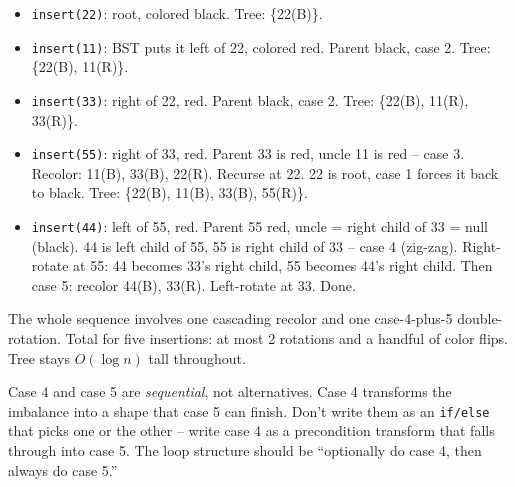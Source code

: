 \documentclass[11pt]{article}
\begin{document}
\begin{itemize}[leftmargin=*]
    \item \texttt{insert(22)}: root, colored black. Tree: \{22(B)\}.
    \item \texttt{insert(11)}: BST puts it left of 22, colored red. Parent black, case 2. Tree: \{22(B), 11(R)\}.
    \item \texttt{insert(33)}: right of 22, red. Parent black, case 2. Tree: \{22(B), 11(R), 33(R)\}.
    \item \texttt{insert(55)}: right of 33, red. Parent 33 is red, uncle 11 is red -- case 3. Recolor: 11(B), 33(B), 22(R). Recurse at 22. 22 is root, case 1 forces it back to black. Tree: \{22(B), 11(B), 33(B), 55(R)\}.
    \item \texttt{insert(44)}: left of 55, red. Parent 55 red, uncle = right child of 33 = null (black). 44 is left child of 55, 55 is right child of 33 -- case 4 (zig-zag). Right-rotate at 55: 44 becomes 33's right child, 55 becomes 44's right child. Then case 5: recolor 44(B), 33(R). Left-rotate at 33. Done.
\end{itemize}

The whole sequence involves one cascading recolor and one case-4-plus-5 double-rotation. Total for five insertions: at most 2 rotations and a handful of color flips. Tree stays $O(\log n)$ tall throughout.

\begin{warnbox}
Case 4 and case 5 are \emph{sequential}, not alternatives. Case 4 transforms the imbalance into a shape that case 5 can finish. Don't write them as an \texttt{if/else} that picks one or the other -- write case 4 as a precondition transform that falls through into case 5. The loop structure should be ``optionally do case 4, then always do case 5.''
\end{warnbox}
\end{document}
